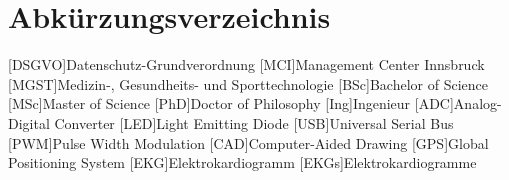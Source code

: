 \section*{Abkürzungsverzeichnis}
\begin{acronym}[DSGVO] %
	[DSGVO]{Datenschutz-Grundverordnung}
	[MCI]{Management Center Innsbruck}
	[MGST]{Medizin-, Gesundheits- und Sporttechnologie}
	[BSc]{Bachelor of Science}
 	[MSc]{Master of Science}
 	[PhD]{Doctor of Philosophy}
	[Ing]{Ingenieur}
	[ADC]{Analog-Digital Converter}
	[LED]{Light Emitting Diode}
	[USB]{Universal Serial Bus}
	[PWM]{Pulse Width Modulation}
	[CAD]{Computer-Aided Drawing}
	[GPS]{Global Positioning System}
	[EKG]{Elektrokardiogramm}
		{Elektrokardiogramme} %
\end{acronym}